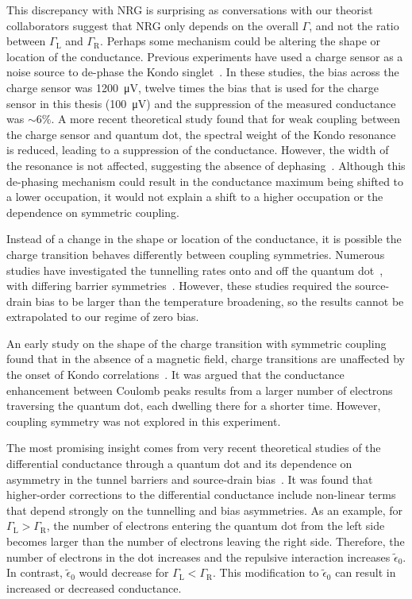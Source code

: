 This discrepancy with NRG is surprising as conversations with our theorist collaborators suggest that NRG only depends on the overall $\Gamma$, and not the ratio between $\Gamma_\mathrm{L}$ and $\Gamma_\mathrm{R}$.
Perhaps some mechanism could be altering the shape or location of the conductance. 
Previous experiments have used a charge sensor as a noise source to de-phase the Kondo singlet~\cite{kondo_controlled_dephasing}. In these studies, the bias across the charge sensor was \qty{1200}{\micro V}, twelve times the bias that is used for the charge sensor in this thesis (\qty{100}{\micro V}) and the suppression of the measured conductance was $\sim6\%$. 
A more recent theoretical study found that for weak coupling between the charge sensor and quantum dot, the spectral weight of the Kondo resonance is reduced, leading to a suppression of the conductance. However, the width of the resonance is not affected, suggesting the absence of dephasing~\cite{peculiar_dephasing_of_kondo}. Although this de-phasing mechanism could result in the conductance maximum being shifted to a lower occupation, it would not explain a shift to a higher occupation or the dependence on symmetric coupling.


Instead of a change in the shape or location of the conductance, it is possible the charge transition behaves differently between coupling symmetries. 
Numerous studies have investigated the tunnelling rates onto and off the quantum dot~\cite{MacLean2007,Ihn2009,Kng2012}, with differing barrier symmetries~\cite{Rogge2005,Gustavsson2006}. However, these studies required the source-drain bias to be larger than the temperature broadening, so the results cannot be extrapolated to our regime of zero bias. 

An early study on the shape of the charge transition with symmetric coupling found that in the absence of a magnetic field, charge transitions are unaffected by the onset of Kondo correlations~\cite{Sprinzak2002}. It was argued that the conductance enhancement between Coulomb peaks results from a larger number of electrons traversing the quantum dot, each dwelling there for a shorter time. However, coupling symmetry was not explored in this experiment. 


 The most promising insight comes from very recent theoretical studies of the differential conductance through a quantum dot and its dependence on asymmetry in the tunnel barriers and source-drain bias~\cite{Tsutsumi2021,kondo_nrg_asymmetric}. 
 It was found that higher-order corrections to the differential conductance include non-linear terms that depend strongly on the tunnelling and bias asymmetries. As an example, for $\Gamma_\mathrm{L}>\Gamma_\mathrm{R}$, the number of electrons entering the quantum dot from the left side becomes larger than the number of electrons leaving the right side. Therefore, the number of electrons in the dot increases and the repulsive interaction increases $\tilde{\epsilon}_0$. In contrast, $\tilde{\epsilon}_0$ would decrease for $\Gamma_\mathrm{L}<\Gamma_\mathrm{R}$. This modification to $\tilde{\epsilon}_0$ can result in increased or decreased conductance. 

